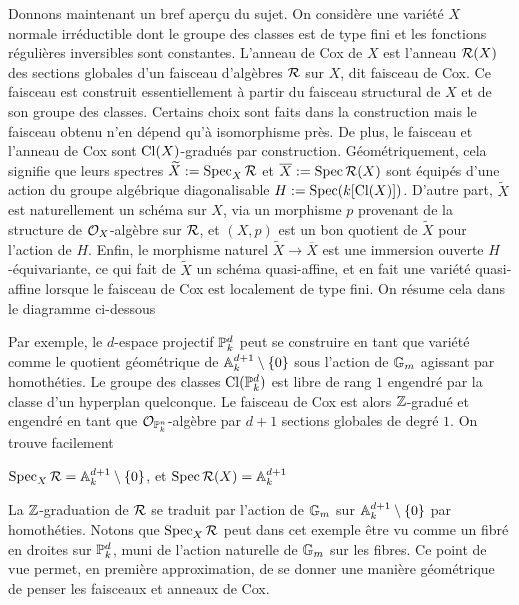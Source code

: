 Donnons maintenant un bref aperçu du sujet. On considère une variété $X$ normale irréductible dont le groupe des classes est de type fini et les fonctions régulières inversibles sont constantes. L'anneau de Cox de $X$ est l'anneau $\mathcal{R}(X)$ des sections globales d'un faisceau d'algèbres $\mathcal{R}$ sur $X$, dit faisceau de Cox. Ce faisceau est construit essentiellement à partir du faisceau structural de $X$ et de son groupe des classes. Certains choix sont faits dans la construction mais le faisceau obtenu n'en dépend qu'à isomorphisme près. De plus, le faisceau et l'anneau de Cox sont $\operatorname{Cl}(X)$-gradués par construction. Géométriquement, cela signifie que leurs spectres $\widetilde{X}:=\operatorname{Spec}_X \mathcal{R}$ et $\overline{X}:=\operatorname{Spec} \mathcal{R}(X)$ sont équipés d'une action du groupe algébrique diagonalisable $H:=\operatorname{Spec}(k[\operatorname{Cl}(X)])$. D'autre part, $\widetilde{X}$ est naturellement un schéma sur $X$, via un morphisme $p$ provenant de la structure de $\mathcal{O}_X$-algèbre sur $\mathcal{R}$, et $(X, p)$ est un bon quotient de $\widetilde{X}$ pour l'action de $H$. Enfin, le morphisme naturel $\widetilde{X}\rightarrow \overline{X}$ est une immersion ouverte $H$-équivariante, ce qui fait de $\widetilde{X}$ un schéma quasi-affine, et en fait une variété quasi-affine lorsque le faisceau de Cox est localement de type fini. On résume cela dans le diagramme ci-dessous
	\begin{center}
	\end{center}

Par exemple, le $d$-espace projectif $\mathbb{P}_k^d$ peut se construire en tant que variété comme le quotient géométrique de $\mathbb{A}^{d+1}_k\setminus \lbrace 0 \rbrace$ sous l'action de $\mathbb{G}_m$ agissant par homothéties. Le groupe des classes $\operatorname{Cl}(\mathbb{P}_k^d)$ est libre de rang $1$ engendré par la classe d'un hyperplan quelconque. Le faisceau de Cox est alors $\mathbb{Z}$-gradué et engendré en tant que $\mathcal{O}_{\mathbb{P}_k^n}$-algèbre par $d+1$ sections globales de degré $1$. On trouve facilement
\begin{center}
$\operatorname{Spec}_X\mathcal{R}=\mathbb{A}^{d+1}_k\setminus \lbrace 0 \rbrace$, et $\operatorname{Spec} \mathcal{R}(X)=\mathbb{A}^{d+1}_k$
\end{center}
La $\mathbb{Z}$-graduation de $\mathcal{R}$ se traduit par l'action de $\mathbb{G}_m$ sur $\mathbb{A}^{d+1}_k\setminus \lbrace 0 \rbrace$ par homothéties. Notons que $\operatorname{Spec}_X\mathcal{R}$ peut dans cet exemple être vu comme un fibré en droites sur $\mathbb{P}_k^d$, muni de l'action naturelle de $\mathbb{G}_m$ sur les fibres. Ce point de vue permet, en première approximation, de se donner une manière géométrique de penser les faisceaux et anneaux de Cox.

